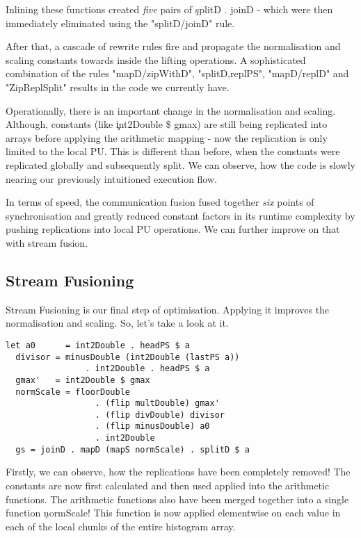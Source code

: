     Inlining these functions created \emph{five} pairs of \c{splitD . joinD} - which were then immediately
    eliminated using the "splitD/joinD" rule.
    
    After that, a cascade of rewrite rules fire and propagate the normalisation and scaling
    constants towards inside the lifting operations. A sophisticated combination of the rules
    "mapD/zipWithD", "splitD,replPS", "mapD/replD" and "ZipReplSplit" results in
    the code we currently have.
    
    Operationally, there is an important change in the normalisation and scaling.
    Although, constants (like \c{int2Double \$ gmax}) are still being replicated into arrays
    before applying the arithmetic mapping - now the replication
    is only limited to the local PU. This is different than before, when
    the constants were replicated globally and subsequently split.
    We can observe, how the code is slowly nearing our previously intuitioned execution flow.
    
    
    In terms of speed, the communication fusion fused together \emph{six} points of synchronisation
    and greatly reduced constant factors in its runtime complexity by pushing
    replications into local PU operations. We can further improve on that with stream fusion.
    
  \subsection{Stream Fusioning}
    Stream Fusioning is our final step of optimisation. Applying it improves
    the normalisation and scaling. So, let's take a look at it.
    \begin{lstlisting}
let a0      = int2Double . headPS $ a 
  divisor = minusDouble (int2Double (lastPS a))
                . int2Double . headPS $ a
  gmax'   = int2Double $ gmax
  normScale = floorDouble
                  . (flip multDouble) gmax'
                  . (flip divDouble) divisor
                  . (flip minusDouble) a0
                  . int2Double
  gs = joinD . mapD (mapS normScale) . splitD $ a
     \end{lstlisting}
     Firstly, we can observe, how the replications have been completely removed! The
     constants are now first calculated and then used applied into the
     arithmetic functions. The arithmetic functions also have been merged together into
     a single function \c{normScale}! This function is now applied elementwise
     on each value in each of the local chunks of the entire histogram array.
     
